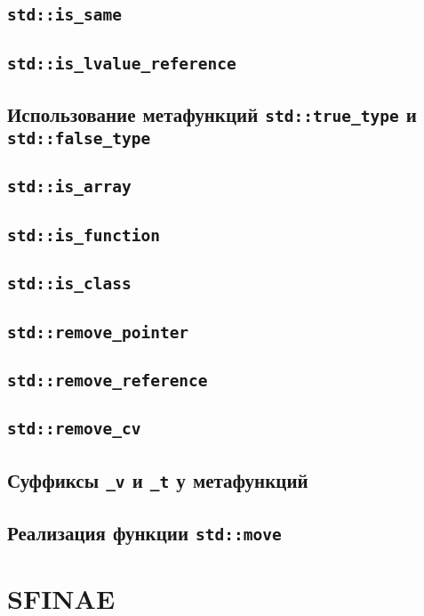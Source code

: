 \documentclass{article}
\begin{document}
\subsection*{\texttt{std::is\_same}}

\subsection*{\texttt{std::is\_lvalue\_reference}}

\subsection*{Использование метафункций \texttt{std::true\_type} и \texttt{std::false\_type}}


\subsection*{\texttt{std::is\_array}}
\subsection*{\texttt{std::is\_function}}
\subsection*{\texttt{std::is\_class}}

\subsection*{\texttt{std::remove\_pointer}}
\subsection*{\texttt{std::remove\_reference}}
\subsection*{\texttt{std::remove\_cv}}
\subsection*{Суффиксы \texttt{\_v} и \texttt{\_t} у метафункций}
\subsection*{Реализация функции \texttt{std::move}}

\section*{SFINAE}
\end{document}

